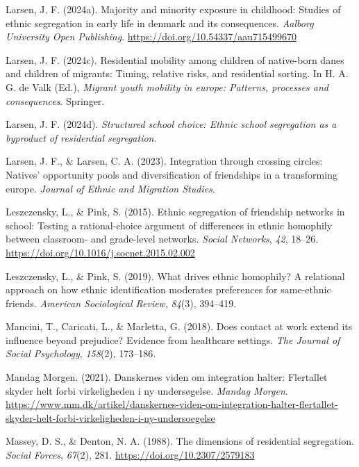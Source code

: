 \documentclass[
]{book}
\newlength{\cslhangindent}
\newenvironment{CSLReferences}[2] %
 {\begin{list}{}{%
  \setlength{\itemindent}{0pt}
  \setlength{\leftmargin}{0pt}
  \setlength{\parsep}{0pt}
  \ifodd #1
   \setlength{\leftmargin}{\cslhangindent}
   \setlength{\itemindent}{-1\cslhangindent}
  \fi
  \setlength{\itemsep}{#2\baselineskip}}}
 {\end{list}}
\begin{document}
\begin{CSLReferences}{1}{0}
Larsen, J. F. (2024a). Majority and minority exposure in childhood: Studies of ethnic segregation in early life in denmark and its consequences. \emph{Aalborg University Open Publishing}. \url{https://doi.org/10.54337/aau715499670}

Larsen, J. F. (2024c). Residential mobility among children of native-born danes and children of migrants: Timing, relative risks, and residential sorting. In H. A. G. de Valk (Ed.), \emph{Migrant youth mobility in europe: Patterns, processes and consequences}. Springer.

Larsen, J. F. (2024d). \emph{Structured school choice: Ethnic school segregation as a byproduct of residential segregation}.

Larsen, J. F., \& Larsen, C. A. (2023). Integration through crossing circles: Natives' opportunity pools and diversification of friendships in a transforming europe. \emph{Journal of Ethnic and Migration Studies}.

Leszczensky, L., \& Pink, S. (2015). Ethnic segregation of friendship networks in school: Testing a rational-choice argument of differences in ethnic homophily between classroom- and grade-level networks. \emph{Social Networks}, \emph{42}, 18--26. \url{https://doi.org/10.1016/j.socnet.2015.02.002}

Leszczensky, L., \& Pink, S. (2019). What drives ethnic homophily? A relational approach on how ethnic identification moderates preferences for same-ethnic friends. \emph{American Sociological Review}, \emph{84}(3), 394--419.

Mancini, T., Caricati, L., \& Marletta, G. (2018). Does contact at work extend its influence beyond prejudice? Evidence from healthcare settings. \emph{The Journal of Social Psychology}, \emph{158}(2), 173--186.

Mandag Morgen. (2021). Danskernes viden om integration halter: Flertallet skyder helt forbi virkeligheden i ny undersøgelse. \emph{Mandag Morgen}. \url{https://www.mm.dk/artikel/danskernes-viden-om-integration-halter-flertallet-skyder-helt-forbi-virkeligheden-i-ny-undersoegelse}

Massey, D. S., \& Denton, N. A. (1988). The dimensions of residential segregation. \emph{Social Forces}, \emph{67}(2), 281. \url{https://doi.org/10.2307/2579183}


\end{CSLReferences}
\end{document}
